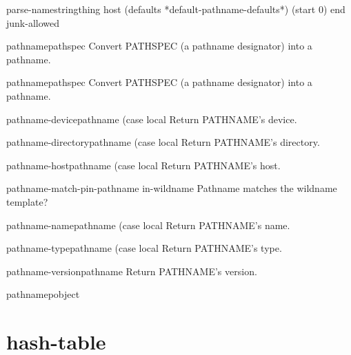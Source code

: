 \begin{function}{parse-namestring}{thing \op host (defaults *default-pathname-defaults*) \key (start 0) end
 junk-allowed}{}
  
\end{function}

\begin{function}{pathname}{pathspec}{}
  Convert PATHSPEC (a pathname designator) into a pathname.
\end{function}

\begin{class}{pathname}{pathspec}{}
  Convert PATHSPEC (a pathname designator) into a pathname.
\end{class}

\begin{function}{pathname-device}{pathname \key (case local}{}
  Return PATHNAME's device.
\end{function}

\begin{function}{pathname-directory}{pathname \key (case local}{}
  Return PATHNAME's directory.
\end{function}

\begin{function}{pathname-host}{pathname \key (case local}{}
  Return PATHNAME's host.
\end{function}

\begin{function}{pathname-match-p}{in-pathname in-wildname}{}
  Pathname matches the wildname template?
\end{function}

\begin{function}{pathname-name}{pathname \key (case local}{}
  Return PATHNAME's name.
\end{function}

\begin{function}{pathname-type}{pathname \key (case local}{}
  Return PATHNAME's type.
\end{function}

\begin{function}{pathname-version}{pathname}{}
  Return PATHNAME's version.
\end{function}

\begin{function}{pathnamep}{object}{}
  
\end{function}

\section{hash-table}

